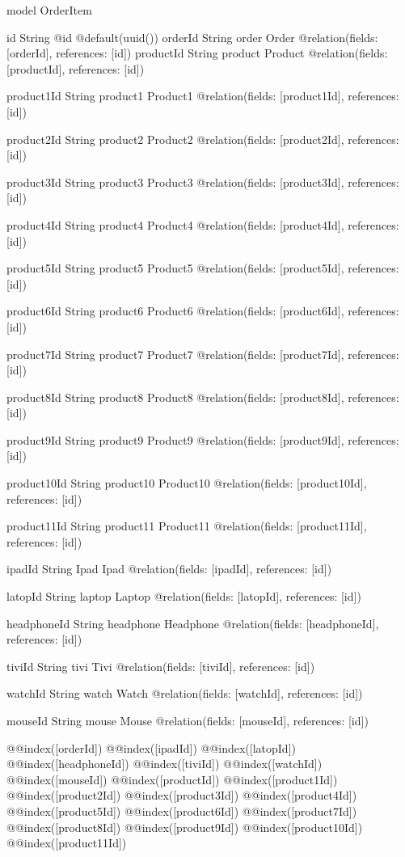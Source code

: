 model OrderItem {
  id        String  @id @default(uuid())
  orderId   String
  order     Order   @relation(fields: [orderId], references: [id])
  productId String
  product   Product @relation(fields: [productId], references: [id])

  product1Id String
  product1   Product1 @relation(fields: [product1Id], references: [id])

  product2Id String
  product2   Product2 @relation(fields: [product2Id], references: [id])

  product3Id String
  product3   Product3 @relation(fields: [product3Id], references: [id])

  product4Id String
  product4   Product4 @relation(fields: [product4Id], references: [id])

  product5Id String
  product5   Product5 @relation(fields: [product5Id], references: [id])

  product6Id String
  product6   Product6 @relation(fields: [product6Id], references: [id])

  product7Id String
  product7   Product7 @relation(fields: [product7Id], references: [id])

  product8Id String
  product8   Product8 @relation(fields: [product8Id], references: [id])

  product9Id String
  product9   Product9 @relation(fields: [product9Id], references: [id])

  product10Id String
  product10   Product10 @relation(fields: [product10Id], references: [id])

  product11Id String
  product11   Product11 @relation(fields: [product11Id], references: [id])

  ipadId String
  Ipad   Ipad   @relation(fields: [ipadId], references: [id])

  latopId String
  laptop  Laptop @relation(fields: [latopId], references: [id])

  headphoneId String
  headphone   Headphone @relation(fields: [headphoneId], references: [id])

  tiviId String
  tivi   Tivi   @relation(fields: [tiviId], references: [id])

  watchId String
  watch   Watch  @relation(fields: [watchId], references: [id])

  mouseId String
  mouse   Mouse  @relation(fields: [mouseId], references: [id])

  @@index([orderId])
  @@index([ipadId])
  @@index([latopId])
  @@index([headphoneId])
  @@index([tiviId])
  @@index([watchId])
  @@index([mouseId])
  @@index([productId])
  @@index([product1Id])
  @@index([product2Id])
  @@index([product3Id])
  @@index([product4Id])
  @@index([product5Id])
  @@index([product6Id])
  @@index([product7Id])
  @@index([product8Id])
  @@index([product9Id])
  @@index([product10Id])
  @@index([product11Id])
}

